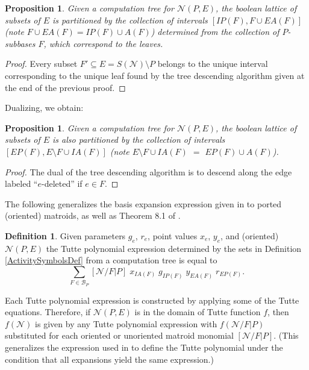 \documentclass[12pt]{article}
\newtheorem{proposition}[theorem]{Proposition}
\theoremstyle{definition}
\newtheorem{definition}[theorem]{Definition}
\begin{document}
\begin{proposition}
\label{PartitionProposition}
Given a computation tree for
$\mathcal{N}(P,E)$, 
the boolean lattice of subsets of $E$
is partitioned by the collection of
intervals $[IP(F),F\cup EA(F)]$ (note $F\cup EA(F)=IP(F)\cup A(F)$)
determined from the collection
of $P$-subbases $F$, which correspond to the leaves.
\end{proposition}

\begin{proof}
Every subset $F'\subseteq E=S(\mathcal{N})\setminus P$ belongs to the
unique interval corresponding to the unique leaf found by the tree descending
algorithm given at the end of the previous proof.
\end{proof}

Dualizing, we obtain:

\begin{proposition}
\label{DualPartitionProposition}
Given a computation tree for
$\mathcal{N}(P,E)$, 
the boolean lattice of subsets of $E$
is also partitioned by the collection of
intervals $[EP(F),E\setminus F\cup IA(F)]$ 
(note $E\setminus F\cup IA(F)$ $=$ $EP(F)\cup A(F)$).
\end{proposition}
\begin{proof} The dual of the tree descending algorithm is to descend along
the edge labeled ``$e$-deleted'' if $e\in F$.
\end{proof}




The following generalizes the basis expansion expression given
in \cite{MR93a:05047} to ported (oriented) matroids, as well as 
Theorem 8.1 of \cite{SetPointedLV}.

\begin{definition}
\label{TuttePolyExpression}
Given parameters $g_e$, $r_e$, point values $x_e$, $y_e$, and 
(oriented) $\mathcal{N}(P,E)$
the Tutte polynomial expression
determined by the sets in Definition 
\ref{ActivitySymbolsDef} 
from a computation tree is 
equal to
\begin{equation}
\sum_{F\in \mathcal{B}_P}[\mathcal{N}/F|P]
\;x_{IA(F)}\;g_{IP(F)}\;y_{EA(F)}\;r_{EP(F)}.
\end{equation}
\end{definition}

Each Tutte polynomial expression is constructed by applying some of the
Tutte equations.  Therefore, if $\mathcal{N}(P,E)$ is in the domain of
Tutte function $f$, then $f(\mathcal{N})$ is given by any Tutte polynomial
expression with $f(\mathcal{N}/F|P)$ substituted for each oriented or 
unoriented matroid monomial $[\mathcal{N}/F|P]$.  (This generalizes the 
expression used in \cite{MR93a:05047} to define the Tutte polynomial under
the condition that all expansions yield the same expression.)
\end{document}
